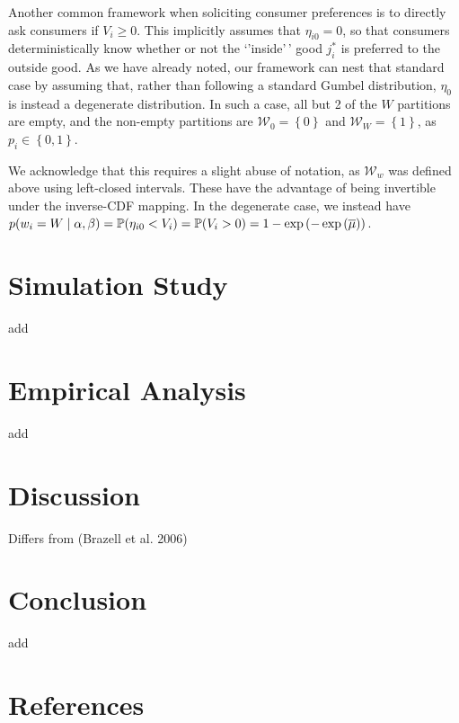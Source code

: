 \documentclass[
]{article}
\begin{document}
Another common framework when soliciting consumer preferences is to
directly ask consumers if \(V_i \ge 0\). This implicitly assumes that
\(\eta_{i0} = 0\), so that consumers deterministically know whether or
not the `'inside'\,' good \(j^*_i\) is preferred to the outside good. As
we have already noted, our framework can nest that standard case by
assuming that, rather than following a standard Gumbel distribution,
\(\eta_0\) is instead a degenerate distribution. In such a case, all but
2 of the \(W\) partitions are empty, and the non-empty partitions are
\(\mathcal{W}_0 = \left\lbrace 0 \right\rbrace\) and
\(\mathcal{W}_W = \left\lbrace 1\right\rbrace\), as
\(p_i \in \left\lbrace 0, 1\right\rbrace\).

We acknowledge that this requires a slight abuse of notation, as
\(\mathcal{W}_w\) was defined above using left-closed intervals. These
have the advantage of being invertible under the inverse-CDF mapping. In
the degenerate case, we instead have
\(p\mleft(w_i = W\mid\alpha,\beta\mright) = \mathbb{P}\mleft(\eta_{i0} < V_i\mright) = \mathbb{P}\mleft(V_i > 0\mright) = 1 - \exp\left(-\exp\left(\overline{\mu}\right)\right)\).

\section{Simulation Study}\label{sec-simstudy}

add

\section{Empirical Analysis}\label{sec-analysis}

add

\section{Discussion}\label{sec-discussion}

Differs from (Brazell et al. 2006)

\section{Conclusion}\label{sec-conclusion}

add

\section*{References}\label{references}
\end{document}
